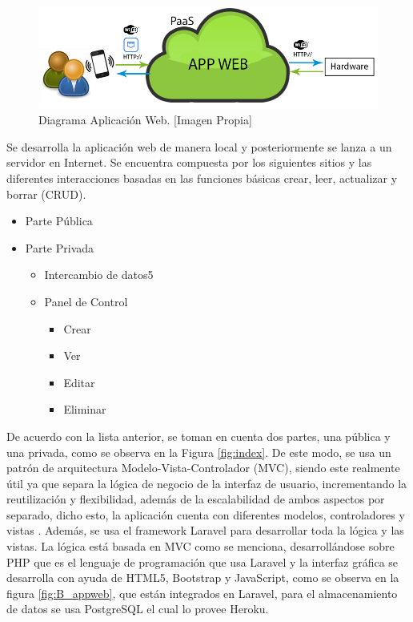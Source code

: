 \begin{figure}[!t]
	\centering
	\caption[Diagrama Aplicación Web.]{Diagrama Aplicación Web. [Imagen Propia]}
	\label{fig:B_appwD}
	\includegraphics[width=0.7\linewidth]{Imagenes/B_AppWebDllo}
\end{figure}

Se desarrolla la aplicación web de manera local y posteriormente se lanza a un servidor en Internet. Se encuentra compuesta por los siguientes sitios y las diferentes interacciones basadas en las funciones básicas crear, leer, actualizar y borrar (CRUD).\\

\begin{itemize}
	\item Parte Pública
	\item Parte Privada
	\begin{itemize}
		\item Intercambio de datos5
		\item Panel de Control
		\begin{itemize}
			\item Crear
			\item Ver
			\item Editar
			\item Eliminar 
		\end{itemize}
	\end{itemize}
\end{itemize}

De acuerdo con la lista anterior, se toman en cuenta dos partes, una pública y una privada, como se observa en la Figura \ref{fig:index}. De este modo, se usa un patrón de arquitectura Modelo-Vista-Controlador (MVC), siendo este realmente útil ya que separa la lógica de negocio de la interfaz de usuario, incrementando la reutilización y flexibilidad, además de la escalabilidad de ambos aspectos por separado, dicho esto, la aplicación cuenta con diferentes modelos, controladores y vistas \cite{MVC1}. Además, se usa el framework Laravel para desarrollar toda la lógica y las vistas. La lógica está basada en MVC como se menciona, desarrollándose sobre PHP que es el lenguaje de programación que usa Laravel y la interfaz gráfica se desarrolla con ayuda de HTML5, Bootstrap y JavaScript, como se observa en la figura \ref{fig:B_appweb}, que están integrados en Laravel, para el almacenamiento de datos se usa PostgreSQL el cual lo provee Heroku.\\

